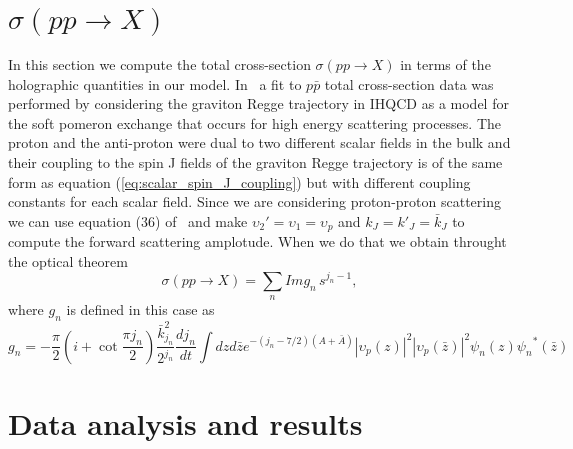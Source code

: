 \documentclass[preprint, 12pt]{elsarticle}
\begin{document}
\section{$\sigma\left(p p \rightarrow X\right)$}

In this section we compute the total cross-section $\sigma\left(p p \rightarrow X \right)$ in terms of the holographic quantities in our model.
In~\cite{Ballon-Bayona:2015wra} a fit to $p \bar{p}$ total cross-section data was performed by considering the graviton Regge trajectory in IHQCD as a model for the soft pomeron exchange that occurs for high energy scattering processes. The proton and the anti-proton were dual to two different scalar fields in the bulk and their coupling to the spin J fields of the graviton Regge trajectory is of the same form as equation (\ref{eq:scalar_spin_J_coupling}) but with different coupling constants for each scalar field. Since we are considering proton-proton scattering we can use equation (36) of~\cite{Ballon-Bayona:2015wra} and make $\upsilon_2' = \upsilon_1 = \upsilon_p$ and $k_J = k'_J = \bar{k}_J$ to compute the forward scattering amplotude. When we do that we obtain throught the optical theorem
\begin{equation}
\sigma\left(p p \rightarrow X\right) = \sum_n Im g_n \, s^{j_n -1},
\end{equation}
where $g_n$ is defined in this case as
\begin{equation}
g_n = - \frac{\pi}{2} \left( i + \cot \frac{\pi j_n}{2} \right) \frac{\bar{k}^2_{j_n}}{2^{j_n}} \frac{d j_n}{dt}  \int d z d\bar{z} e^{-\left(j_n - 7/2 \right)\left(A+\bar{A}\right)} {|\upsilon_p\left(z\right)|}^2 {|\upsilon_p\left(\bar{z}\right)|}^2 \psi_n\left(z\right){\psi_n}^{*}\left(\bar{z}\right)
\label{eq:pp_fit_constant}
\end{equation}

\section{Data analysis and results}
\end{document}
